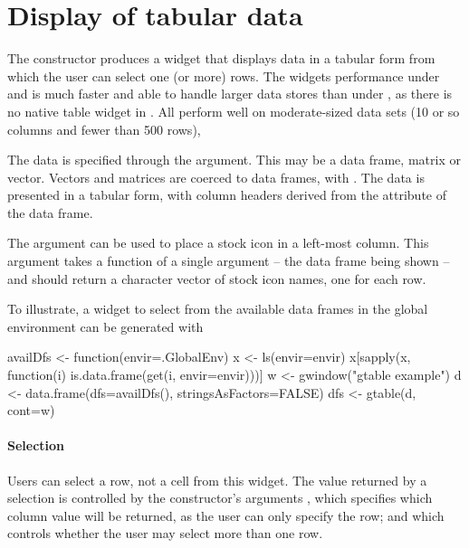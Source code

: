 \section{Display of tabular data}
\label{sec:gWidgets-tabular-data-display}


The  constructor produces a widget that displays
data in a tabular form from which the user can select one (or more)
rows. The widgets performance under  and
 is much faster and able to handle larger data stores
than under , as there is no native table widget in
\tcltk. All perform well on moderate-sized data sets (10 or so columns
and fewer than 500 rows),

The data is specified through the 
argument. This may be a data frame, matrix or vector. Vectors and
matrices are coerced to data frames, with
.  The data is presented in a tabular
form, with column headers derived from the  attribute of
the data frame.

The  argument
can be used to place a stock icon in a left-most column.  This argument
takes a function of a single argument -- the data frame being shown --
and should return a character vector of stock icon names, one for each
row.

To illustrate, a widget to select from the available data frames in
the global environment can be generated with
\begin{Schunk}
\begin{Sinput}
 availDfs <- function(envir=.GlobalEnv) {
   x <- ls(envir=envir)
   x[sapply(x, function(i) is.data.frame(get(i, envir=envir)))]
 }
 w <- gwindow("gtable example")
 d <- data.frame(dfs=availDfs(), stringsAsFactors=FALSE)
 dfs <- gtable(d, cont=w)
\end{Sinput}
\end{Schunk}


\paragraph{Selection}
Users can select a row, not a cell from this widget. The value returned by a selection is
controlled by the constructor's arguments , which
specifies which column value will be returned, as the user can only
specify the row; and  which controls
whether the user may select more than one row.  


